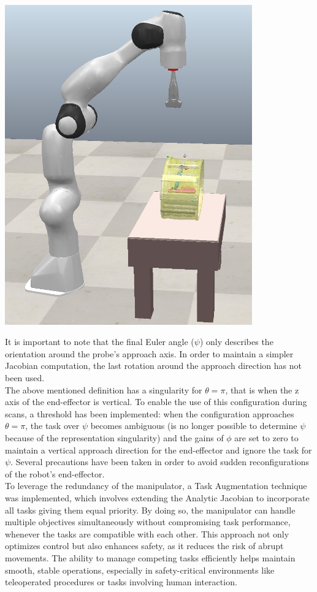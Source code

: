 \documentclass{article}
\begin{document}
\begin{minipage}{0.5\textwidth}
    \centering
    \includegraphics[width=0.8\textwidth]{Robot_standing.png}
    \label{Robot_standing}
\end{minipage}
\vspace{1cm}
\newline
It is important to note that the final Euler angle ($\psi$) only describes the orientation around the probe's approach axis. In order to maintain a simpler Jacobian computation, the last rotation around the approach direction has not been used.
\\
The above mentioned definition has a singularity for $\theta = \pi$, that is when the z axis of the end-effector is vertical. To enable the use of this configuration during scans, a threshold has been implemented: when the configuration approaches $\theta = \pi$, the task over $\psi$ becomes ambiguous (is no longer possible to determine $\psi$ because of the representation singularity) and the gains of $\phi$ are set to zero to maintain a vertical approach direction for the end-effector and ignore the task for $\psi$. Several precautions have been taken in order to avoid sudden reconfigurations of the robot’s end-effector.
\\
To leverage the redundancy of the manipulator, a Task Augmentation technique was implemented, which involves extending the Analytic Jacobian to incorporate all tasks giving them equal priority.
By doing so, the manipulator can handle multiple objectives simultaneously without compromising task performance, whenever the tasks are compatible with each other. This approach not only optimizes control but also enhances safety, as it reduces the risk of abrupt movements. The ability to manage competing tasks efficiently helps maintain smooth, stable operations, especially in safety-critical environments like teleoperated procedures or tasks involving human interaction.
\end{document}
